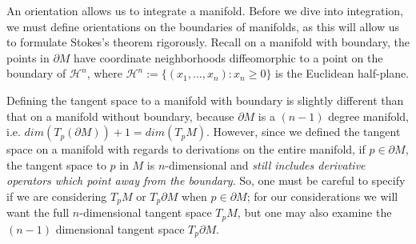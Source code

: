 \documentclass[11pt, oneside]{article}   	%
\theoremstyle{definition}
\begin{document}
An orientation allows us to integrate a manifold. Before we dive into integration, we must define orientations on the 
boundaries of manifolds, as this will allow us to formulate Stokes's theorem rigorously. Recall on a manifold with 
boundary, the points in $\partial M$ have coordinate neighborhoods diffeomorphic to a point on the boundary of 
$\mathcal H^n$, where $\mathcal H^n := \{(x_1, ..., x_n) : x_n\geq 0\}$ is the Euclidean half-plane. 

Defining the tangent space to a manifold with boundary is slightly different than that on a manifold without boundary, 
because $\partial M$ is a $(n - 1)$ degree manifold, i.e. $dim(T_p(\partial M)) + 1 = dim(T_p M)$. However, since we defined 
the tangent space on a manifold with regards to derivations on the entire manifold, if $p\in \partial M$, the tangent space 
to $p$ in $M$ is $n$-dimensional and \textit{still includes derivative operators which point away from the boundary}. 
So, one must be careful to specify if we are considering $T_p M$ or $T_p\partial M$ when $p\in\partial M$; for our 
considerations we will want the full $n$-dimensional tangent space $T_p M$, but one may also examine the $(n - 1)$ 
dimensional tangent space $T_p\partial M$. 
\end{document}
